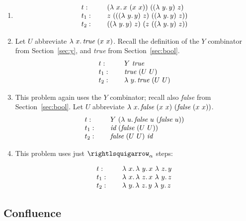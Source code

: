 \begin{enumerate}
\item
\[
  \begin{array}{lll}
    t: & \ & (\lambda\ x.\, x\ (x\ x))\ ((\lambda\ y.\, y)\ z) \\
    t_1: & \ & z\ (((\lambda\ y.\, y)\ z)\ ((\lambda\ y.\, y)\ z))\\
    t_2: & \ & ((\lambda\ y.\, y)\ z)\ (z\ ((\lambda\ y.\, y)\ z))
  \end{array}
  \]

\item Let $U$ abbreviate $\lam{x}{\textit{true}\ (x\ x)}$.  Recall the definition of the $Y$ combinator from Section~\ref{sec:y}, and \textit{true} from Section~\ref{sec:bool}.
  \[
  \begin{array}{lll}
    t: & \ & Y\ \textit{true} \\
    t_1: & \ & \textit{true}\ (U\ U) \\
    t_2: & \ & \lambda\ y.\, \textit{true}\ (U\ U)
  \end{array}
  \]
  
\item This problem again uses the $Y$ combinator; recall also \textit{false} from Section~\ref{sec:bool}.  Let
  $U$ abbreviate $\lam{x}{\textit{false}\ (x\ x)\ (\textit{false}\ (x\ x))}$. 
\[
  \begin{array}{lll}
    t: & \ & Y\ (\lam{u}{\textit{false}\ u\ (\textit{false}\ u)}) \\
    t_1: & \ & \textit{id}\ (\textit{false}\ (U\ U)) \\
    t_2: & \ & \textit{false}\ (U\ U)\ \textit{id}
  \end{array}
  \]

\item This problem uses just $\curva_\alpha$ steps:

\[
  \begin{array}{lll}
    t: & \ &   \lambda\ x.\, \lambda\ y.\, x\ \lambda\ z.\, y\\
    t_1: & \ & \lambda\ x.\, \lambda\ z.\, x\ \lambda\ y.\, z \\
    t_2: & \ & \lambda\ y.\, \lambda\ z.\, y\ \lambda\ y.\, z
  \end{array}
  \]

\end{enumerate}

\subsection{Confluence}

